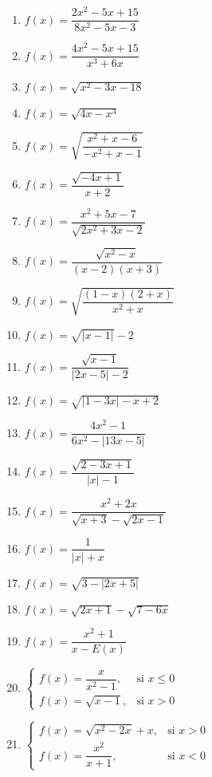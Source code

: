 \documentclass[12pt]{article}
\begin{document}
\noindent
\begin{multicols}{3}
\smaller
{} %
\begin{enumerate}
    \item $f(x) = \dfrac{2x^2 - 5x + 15}{8x^2 - 5x - 3}$
    \item $f(x) = \dfrac{4x^2 - 5x + 15}{x^3 + 6x}$
    \item $f(x) = \sqrt{x^2 - 3x - 18}$
    \item $f(x) = \sqrt{4x - x^3}$
    \item $f(x) = \sqrt{\dfrac{x^2 + x - 6}{-x^2 + x - 1}}$
    \item $f(x) = \dfrac{\sqrt{-4x+1}}{x+2}$
    \item $f(x) = \dfrac{x^2 + 5x - 7}{\sqrt{2x^2 + 3x - 2}}$
    \item $f(x) = \dfrac{\sqrt{x^2 - x}}{(x-2)(x+3)}$
    \item $f(x) = \sqrt{\dfrac{(1-x)(2+x)}{x^2 + x}}$
    \item $f(x) = \sqrt{|x-1|} - 2$
    \item $f(x) = \dfrac{\sqrt{x-1}}{|2x-5| -2}$
\end{enumerate}

\columnbreak

\begin{enumerate}
    \setcounter{enumi}{11}
    \item $f(x) = \sqrt{|1 - 3x| - x + 2}$
    \item $f(x) = \dfrac{4x^2 -1}{6x^2 - |13x - 5|}$
    \item $f(x) = \dfrac{\sqrt{2-3x+1}}{|x| - 1}$
    \item $f(x) = \dfrac{x^2 + 2x}{\sqrt{x+3} - \sqrt{2x-1}}$
    \item $f(x) = \dfrac{1}{|x| + x}$
    \item $f(x) = \sqrt{3 - |2x + 5|}$
    \item $f(x) = \sqrt{2x + 1} - \sqrt{7 - 6x}$
    \item $f(x) = \dfrac{x^2 + 1}{x - E(x)}$
    \item $\left\{
        \begin{array}{ll}
            f(x) = \dfrac{x}{x^2 - 1}, & \text{si } x \leq 0 \\
            f(x) = \sqrt{x - 1}, & \text{si } x > 0
        \end{array}
    \right.$
    
    \item $\left\{
        \begin{array}{ll}
            f(x) = \sqrt{x^2 - 2x} + x, & \text{si } x > 0 \\
            f(x) = \dfrac{x^2}{x+1}, & \text{si } x < 0
        \end{array}
    \right.$
\end{enumerate}


\end{multicols}
\end{document}
